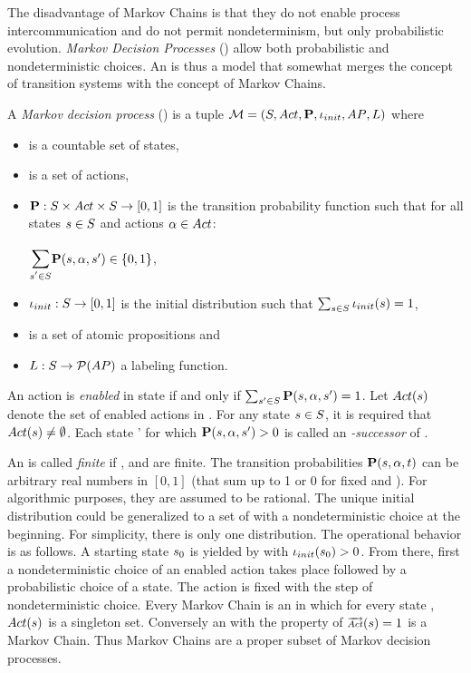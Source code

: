 \documentclass[preview]{standalone}
\begin{document}
The disadvantage of Markov Chains is that they do not enable process intercommunication and do not permit nondeterminism, but only probabilistic evolution. \emph{Markov Decision Processes} (\mdpsN) allow both probabilistic and nondeterministic choices. An \mdpN is thus a model that somewhat merges the concept of transition systems with the concept of Markov Chains.

\begin{definition}
	A \emph{Markov decision process} (\mdpN) is a tuple ${{\mathcal{M}}} = {({S}, {Act}, {\textbf{P}}, {\iota_{init}}, {AP}, {L})}$ where
	\begin{itemize}
		\item \states is a countable set of states,
		\item \actions is a set of actions,
		\item ${\textbf{P}} : {S} \times {Act} \times {S} \to [0,1]$ is the transition probability function such that for all states ${s} \in {S}$ and actions ${\alpha} \in {Act}$:
		\begin{center}
			$\bbigsum{\state' \in \states}\probtfunc(\state,\action,\state') \in \{0,1\}$,
		\end{center}
		\item ${\iota_{init}} : {S} \to [0,1]$ is the initial distribution such that $\sum_{{s} \in {S}} {\iota_{init}}({s}) = 1$,
		\item \atomicprops is  a set of atomic propositions and
		\item ${L} : {S} \to {\mathcal{P}(\ensuremath{{AP}})}$ a labeling function.
	\end{itemize}
	An action \action is \emph{enabled} in state \state if and only if $\sum_{{s}' \in {S}} {\textbf{P}}({s},{\alpha},{s}') = 1$. Let ${Act}({s})$ denote the set of enabled actions in \state. For any state ${s} \in {S}$, it is required that ${Act}({s}) \neq \emptyset$. Each state \state' for which ${\textbf{P}}({s},{\alpha},{s}') > 0$ is called an \emph{\action-successor} of \state.
\end{definition}

An \mdpN is called \emph{finite} if \states, \actions and \atomicprops are finite. The transition probabilities ${\textbf{P}}({s}, {\alpha}, t)$ can be arbitrary real numbers in $[0,1]$ (that sum up to 1 or 0 for fixed \state and \action). For algorithmic purposes, they are assumed to be rational.  The unique initial distribution \initdistrib could be generalized to a set of \initdistrib with a nondeterministic choice at the beginning. For simplicity, there is only one distribution. The operational behavior is as follows. A starting state ${s}_0$ is yielded by \initdistrib with ${\iota_{init}}({s}_0) > 0$. From there, first a nondeterministic choice of an enabled action takes place followed by a probabilistic choice of a state. The action is fixed with the step of nondeterministic choice. Every Markov Chain is an \mdpN in which for every state \state, ${Act}({s})$ is a singleton set. Conversely an \mdpN with the property of $\outacts(\state) = 1$ is a Markov Chain. Thus Markov Chains are a proper subset of Markov decision processes.
\end{document}
